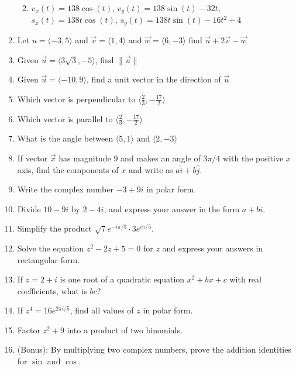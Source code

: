 \documentclass[
]{article}
\providecommand{\tightlist}{%
  \setlength{\itemsep}{0pt}\setlength{\parskip}{0pt}}
\begin{document}
\begin{enumerate}
  \begin{enumerate}
  \def\labelenumii{\Alph{enumii}.}
  \tightlist
  \item
    \(v_x(t) = 138\cos(t)\), \(v_y(t) = 138\sin(t) - 32t\),
    \(s_x(t) = 138t \cos(t)\), \(s_y(t) = 138t \sin(t) - 16t^2 + 4\)
  \end{enumerate}
\item
  Let \(u = \langle -3,5 \rangle\) and
  \(\vec{v} = \langle 1, 4 \rangle\) and
  \(\vec{w} = \langle 6, -3 \rangle\) find
  \(\vec{u} + 2\vec{v} - \vec{w}\)
\item
  Given \(\vec{u} = \langle 3\sqrt3, -5 \rangle\), find
  \(\| \vec{u} \|\)
\item
  Given \(\vec{u} = \langle -10 , 9 \rangle\), find a unit vector in the
  direction of \(\vec{u}\)
\item
  Which vector is perpendicular to
  \(\langle \frac23, -\frac{17}{2} \rangle\)
\item
  Which vector is parallel to \(\langle \frac23, -\frac{17}{2} \rangle\)
\item
  What is the angle between \(\langle 5, 1 \rangle\) and
  \(\langle 2, -3 \rangle\)
\item
  If vector \(\vec{x}\) has magnitude 9 and makes an angle of \(3\pi/4\)
  with the positive \(x\) axis, find the components of \(x\) and write
  as \(a\hat{i} + b\hat{j}\).
\item
  Write the complex number \(-3 + 9i\) in polar form.
\item
  Divide \(10 - 9i\) by \(2 - 4i\), and express your answer in the form
  \(a + bi\).
\item
  Simplify the product \(\sqrt7 e^{-i\pi/3} \cdot 3e^{i\pi/5}\).
\item
  Solve the equation \(z^2 - 2z + 5 = 0\) for \(z\) and express your
  answers in rectangular form.
\item
  If \(z = 2+i\) is one root of a quadratic equation \(x^2 + bx + c\)
  with real coefficients, what is \(bc\)?
\item
  If \(z^4 = 16e^{2\pi i / 5}\), find all values of \(z\) in polar form.
\item
  Factor \(z^2 + 9\) into a product of two binomials.
\item
  (Bonus): By multiplying two complex numbers, prove the addition
  identities for \(\sin\) and \(\cos\).
\end{enumerate}
\end{document}
